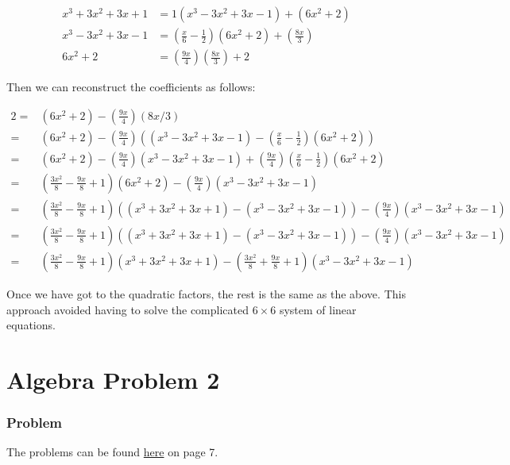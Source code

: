 \documentclass{article}
\begin{document}
\begin{align*}
x^3 + 3x^2 + 3x + 1 &= 1                                      (x^3 - 3x^2 + 3x - 1)      + (6x^2 + 2)                 \\
x^3 - 3x^2 + 3x - 1 &= \left(\frac{x}{6} - \frac{1}{2}\right) (6x^2 + 2)                 + \left(\frac{8x}{3}\right)  \\
6x^2 + 2            &= \left(\frac{9x}{4}\right)               \left(\frac{8x}{3}\right) + 2 
\end{align*}

Then we can reconstruct the coefficients as follows:

\begin{align*}
   2 =& (6x^2 + 2) - \left(\frac{9x}{4}\right)(8x/3) \\
     =& (6x^2 + 2) - \left(\frac{9x}{4}\right)((x^3 - 3x^2 + 3x - 1) -  \left(\frac{x}{6} - \frac{1}{2}\right) (6x^2 + 2)) \\
     =& (6x^2 + 2) - \left(\frac{9x}{4}\right)(x^3 - 3x^2 + 3x - 1) + \left(\frac{9x}{4}\right) \left(\frac{x}{6} - \frac{1}{2}\right) (6x^2 + 2) \\
     =& \left(\frac{3x^2}{8} - \frac{9x}{8} + 1\right) (6x^2 + 2) - \left(\frac{9x}{4}\right)(x^3 - 3x^2 + 3x - 1)  \\
     =& \left(\frac{3x^2}{8} - \frac{9x}{8} + 1\right) ((x^3 + 3x^2 + 3x + 1) - (x^3 - 3x^2 + 3x - 1)) - \left(\frac{9x}{4}\right)(x^3 - 3x^2 + 3x - 1)  \\
     =& \left(\frac{3x^2}{8} - \frac{9x}{8} + 1\right) ((x^3 + 3x^2 + 3x + 1) - (x^3 - 3x^2 + 3x - 1)) - \left(\frac{9x}{4}\right)(x^3 - 3x^2 + 3x - 1)  \\
     =& \left(\frac{3x^2}{8} - \frac{9x}{8} + 1\right) (x^3 + 3x^2 + 3x + 1) - \left(\frac{3x^2}{8} + \frac{9x}{8} + 1\right) (x^3 - 3x^2 + 3x - 1)
\end{align*}

Once we have got to the quadratic factors, the rest is the same as the above. This approach avoided having to solve the complicated $ 6 \times 6 $ system of linear equations.

\section*{Algebra Problem 2}
\subsubsection*{Problem}
The problems can be found \href{https://www.math.hkust.edu.hk/~makyli/190_2010Sp/problemBk.pdf}{here} on page 7.
\end{document}
